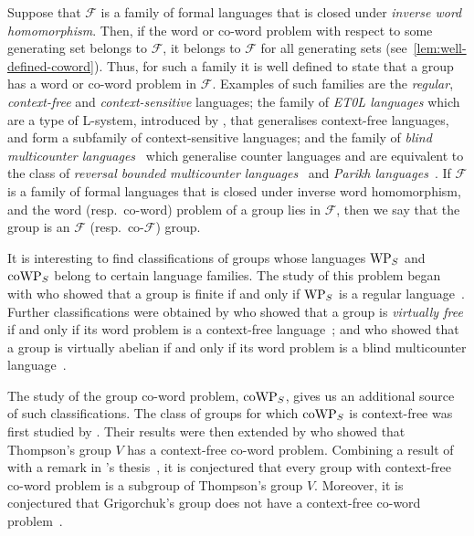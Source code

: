 Suppose that $\mathcal{F}$ is a family of formal languages that is closed under \emph{inverse word homomorphism}.
Then, if the word or co-word problem with respect to some generating set belongs to $\mathcal{F}$, it belongs to $\mathcal{F}$ for all generating sets (see~\cref{lem:well-defined-coword}).
Thus, for such a family it is well defined to state that a group has a word or co-word problem in $\mathcal{F}$.
Examples of such families are the \emph{regular}, \emph{context-free} and \emph{context-sensitive} languages; the family of \emph{ET0L languages} which are a type of L-system, introduced by \textcite{rozenberg1973}, that generalises context-free languages, and form a subfamily of context-sensitive languages; and the family of \emph{blind multicounter languages}~\cite{greibach1978} which generalise counter languages and are equivalent to the class of \emph{reversal bounded multicounter languages}~\cite{baker1974} and \emph{Parikh languages}~\cite{klaedtke2003}.
If $\mathcal{F}$ is a family of formal languages that is closed under inverse word homomorphism, and the word (resp.~co-word) problem of a group lies in $\mathcal{F}$, then we say that the group is an $\mathcal{F}$ (resp.~co-$\mathcal{F}$) group.

It is interesting to find classifications of groups whose languages $\mathrm{WP}_S$ and $\mathrm{coWP}_S$ belong to certain language families.
The study of this problem began with \citeauthor{anisimov1971} who showed that a group is finite if and only if $\mathrm{WP}_S$ is a regular language~\cite{anisimov1971}.
Further classifications were obtained by \citeauthor{muller1983} who showed that a group is \emph{virtually free} if and only if its word problem is a context-free language~\cite{muller1983}; and \citeauthor{elder2008} who showed that a group is virtually abelian if and only if its word problem is a blind multicounter language~\cite{elder2008}.

The study of the group co-word problem, $\mathrm{coWP}_S$, gives us an additional source of such classifications.
The class of groups for which $\mathrm{coWP}_S$ is context-free was first studied by \textcite{holt2005}.
Their results were then extended by \textcite{lehnert2007} who showed that Thompson's group $V$ has a context-free co-word problem.
Combining a result of \textcite{bleak2016} with a remark in \citeauthor{lehnert2008}'s thesis~\cite[\S\,4.2]{lehnert2008}, it is conjectured that every group with context-free co-word problem is a subgroup of Thompson's group $V$.
Moreover, it is conjectured that Grigorchuk's group does not have a context-free co-word problem~\cite{bleak2016}.

